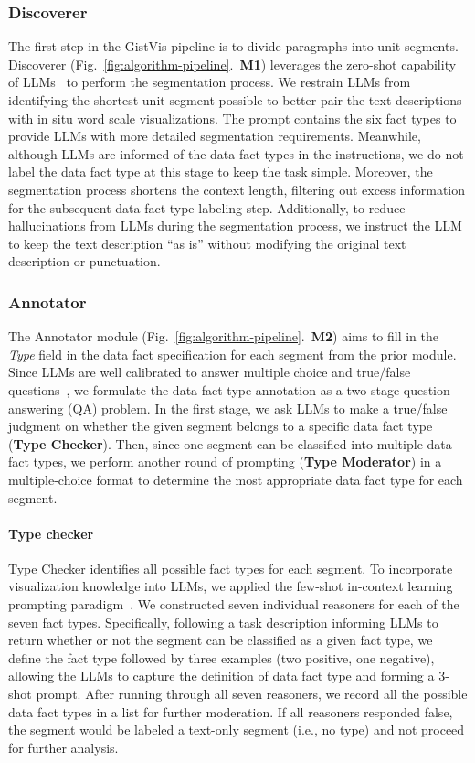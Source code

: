 \subsubsection{Discoverer}
The first step in the GistVis pipeline is to divide paragraphs into unit segments. Discoverer (Fig.~\ref{fig:algorithm-pipeline}.~\textbf{M1}) leverages the zero-shot capability of LLMs~\cite{brown2020language} to perform the segmentation process. We restrain LLMs from identifying the shortest unit segment possible to better pair the text descriptions with in situ word scale visualizations. The prompt contains the six fact types to provide LLMs with more detailed segmentation requirements. Meanwhile, although LLMs are informed of the data fact types in the instructions, we do not label the data fact type at this stage to keep the task simple.
Moreover, the segmentation process shortens the context length, filtering out excess information for the subsequent data fact type labeling step. Additionally, to reduce hallucinations from LLMs during the segmentation process, we instruct the LLM to keep the text description ``as is'' without modifying the original text description or punctuation.

\subsubsection{Annotator}
The Annotator module (Fig.~\ref{fig:algorithm-pipeline}.~\textbf{M2}) aims to fill in the \textit{Type} field in the data fact specification for each segment from the prior module. Since LLMs are well calibrated to answer multiple choice and true/false questions~\cite{kadavath2022language}, we formulate the data fact type annotation as a two-stage question-answering (QA) problem. In the first stage, we ask LLMs to make a true/false judgment on whether the given segment belongs to a specific data fact type (\textbf{Type Checker}). Then, since one segment can be classified into multiple data fact types, we perform another round of prompting (\textbf{Type Moderator}) in a multiple-choice format to determine the most appropriate data fact type for each segment.

\paragraph{Type checker}
Type Checker identifies all possible fact types for each segment. To incorporate visualization knowledge into LLMs, we applied the few-shot in-context learning prompting paradigm~\cite{brown2020language}. We constructed seven individual reasoners for each of the seven fact types. Specifically, following a task description informing LLMs to return whether or not the segment can be classified as a given fact type, we define the fact type followed by three examples (two positive, one negative), allowing the LLMs to capture the definition of data fact type and forming a 3-shot prompt. After running through all seven reasoners, we record all the possible data fact types in a list for further moderation. If all reasoners responded false, the segment would be labeled a text-only segment (i.e., no type) and not proceed for further analysis.


